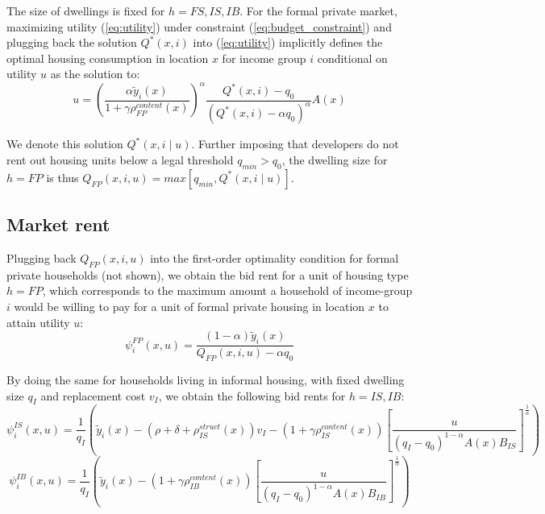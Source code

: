 \documentclass[12pt]{article}
\begin{document}
The size of dwellings is fixed for $h=FS,IS,IB$. For the formal private market, maximizing utility (\ref{eq:utility}) under constraint (\ref{eq:budget_constraint}) and plugging back the solution $Q^*(x,i)$ into (\ref{eq:utility}) implicitly defines the optimal housing consumption in location $x$ for income group $i$ conditional on utility $u$ as the solution to:
\begin{equation}
\label{eq:implicit_dwelling_size}
    u= \left(\frac{\alpha \tilde{y}_i(x)}{1 + \gamma \rho_{FP}^{content}(x)}\right)^\alpha \frac{Q^*(x,i)-q_0}{(Q^*(x,i) - \alpha q_0)^\alpha} A(x)
\end{equation}

We denote this solution $Q^*(x,i \mid u)$. Further imposing that developers do not rent out housing units below a legal threshold $q_{min}>q_0$, the dwelling size for $h=FP$ is thus $Q_{FP}(x,i,u) = max \left[ q_{min},Q^*(x,i \mid u) \right]$.

\subsection{Market rent}

Plugging back $Q_{FP}(x,i,u)$ into the first-order optimality condition for formal private households (not shown), we obtain the bid rent for a unit of housing type $h=FP$, which corresponds to the maximum amount a household of income-group $i$ would be willing to pay for a unit of formal private housing in location $x$ to attain utility $u$:
\begin{equation}
    \psi_i^{FP}(x,u) = \frac{(1-\alpha)\tilde{y}_i(x)}{Q_{FP}(x,i,u) - \alpha q_0} 
\end{equation}

By doing the same for households living in informal housing, with fixed dwelling size $q_I$ and replacement cost $v_I$, we obtain the following bid rents for $h=IS,IB$:
\begin{equation}
    \psi_i^{IS}(x,u) = \frac{1}{q_I}\left(\tilde{y}_i(x) - \left(\rho + \delta + \rho_{IS}^{struct}(x)\right)v_I - \left(1 + \gamma \rho_{IS}^{content}(x)\right)\left[\frac{u}{(q_I-q_0)^{1-\alpha}A(x)B_{IS}}\right]^\frac{1}{\alpha}\right)
\end{equation}
\begin{equation}
    \psi_i^{IB}(x,u) = \frac{1}{q_I}\left(\tilde{y}_i(x) - \left(1 + \gamma \rho_{IB}^{content}(x)\right)\left[\frac{u}{(q_I-q_0)^{1-\alpha}A(x)B_{IB}}\right]^\frac{1}{\alpha}\right)
\end{equation}
\end{document}
